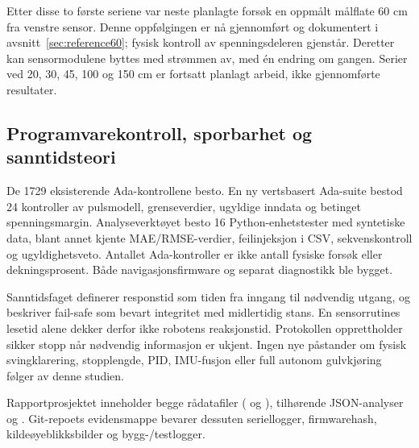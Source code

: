Etter disse to første seriene var neste planlagte forsøk en oppmålt
målflate 60 cm fra venstre sensor. Denne oppfølgingen er nå gjennomført
og dokumentert i avsnitt~\ref{sec:reference60}; fysisk kontroll av
spenningsdeleren gjenstår. Deretter kan sensormodulene byttes med
strømmen av, med én endring om gangen. Serier ved 20, 30, 45, 100 og
150 cm er fortsatt planlagt arbeid, ikke gjennomførte resultater.

\subsection{Programvarekontroll, sporbarhet og sanntidsteori}
De 1729 eksisterende Ada-kontrollene besto. En ny vertsbasert Ada-suite
bestod 24 kontroller av pulsmodell, grenseverdier, ugyldige inndata og
betinget spenningsmargin. Analyseverktøyet besto 16 Python-enhetstester
med syntetiske data, blant annet kjente MAE/RMSE-verdier,
feilinjeksjon i CSV, sekvenskontroll og ugyldighetsveto. Antallet
Ada-kontroller er ikke antall fysiske forsøk eller dekningsprosent.
Både navigasjonsfirmware og separat diagnostikk ble bygget.

Sanntidsfaget definerer responstid som tiden fra inngang til nødvendig
utgang, og beskriver fail-safe som bevart integritet med midlertidig
stans\cite[PDF-s.~20 og 74]{forelesninger2026}. En sensorrutines
lesetid alene dekker derfor ikke robotens reaksjonstid. Protokollen
opprettholder sikker stopp når nødvendig informasjon er ukjent.
Ingen nye påstander om fysisk svingklarering, stopplengde, PID,
IMU-fusjon eller full autonom gulvkjøring følger av denne studien.

Rapportprosjektet inneholder begge rådatafiler (
og ), tilhørende JSON-analyser og
. Git-repoets evidensmappe bevarer dessuten
seriellogger, firmwarehash, kildeøyeblikksbilder og bygg-/testlogger.


